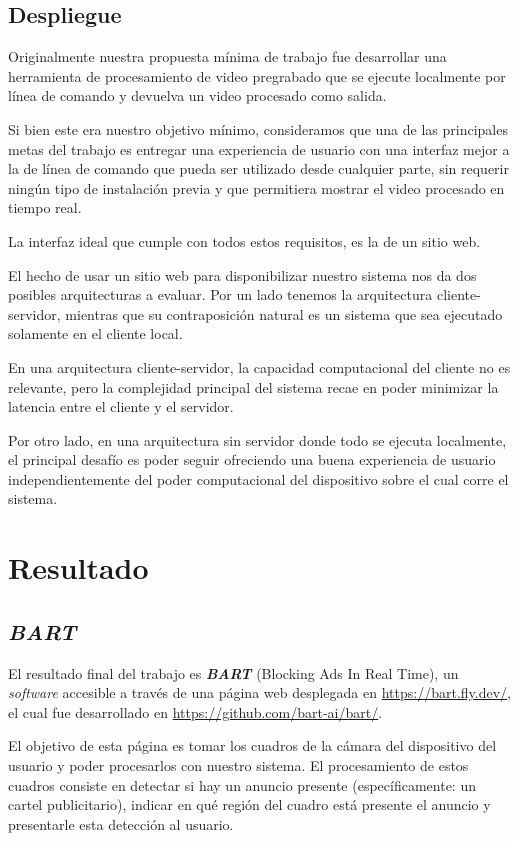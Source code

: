 \documentclass[a4paper]{article}
\begin{document}
\subsection{Despliegue}

Originalmente nuestra propuesta mínima de trabajo fue desarrollar una herramienta de procesamiento de video pregrabado que se ejecute localmente por línea de comando y devuelva un video procesado como salida.

Si bien este era nuestro objetivo mínimo, consideramos que una de las principales metas del trabajo es entregar una experiencia de usuario con una interfaz mejor a la de línea de comando que pueda ser utilizado desde cualquier parte, sin requerir ningún tipo de instalación previa y que permitiera mostrar el video procesado en tiempo real.

La interfaz ideal que cumple con todos estos requisitos, es la de un sitio web.

El hecho de usar un sitio web para disponibilizar nuestro sistema nos da dos posibles arquitecturas a evaluar. Por un lado tenemos la arquitectura cliente-servidor, mientras que su contraposición natural es un sistema que sea ejecutado solamente en el cliente local.

En una arquitectura cliente-servidor, la capacidad computacional del cliente no es relevante, pero la complejidad principal del sistema recae en poder minimizar la latencia entre el cliente y el servidor.

Por otro lado, en una arquitectura sin servidor donde todo se ejecuta localmente, el principal desafío es poder seguir ofreciendo una buena experiencia de usuario independientemente del poder computacional del dispositivo sobre el cual corre el sistema.

\section{Resultado}

\subsection{\textit{BART}}

El resultado final del trabajo es \textit{\textbf{BART}} (Blocking Ads In Real Time), un \textit{software} accesible a través de una página web desplegada en \url{https://bart.fly.dev/}, el cual fue desarrollado en \url{https://github.com/bart-ai/bart/}.

El objetivo de esta página es tomar los cuadros de la cámara del dispositivo del usuario y poder procesarlos con nuestro sistema. El procesamiento de estos cuadros consiste en detectar si hay un anuncio presente (específicamente: un cartel publicitario), indicar en qué región del cuadro está presente el anuncio y presentarle esta detección al usuario.
\end{document}
